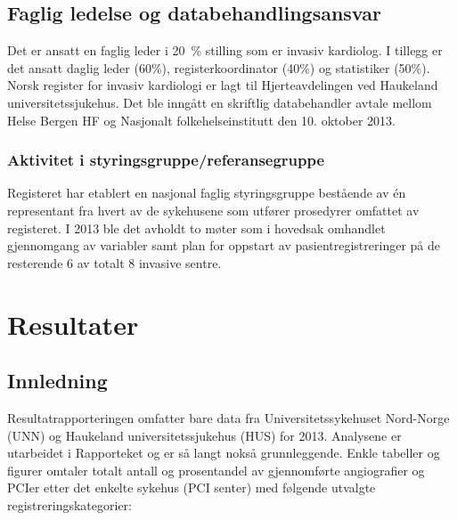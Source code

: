 \documentclass[norsk, a4paper]{report}
\begin{document}
\section{Faglig ledelse og databehandlingsansvar}\label{cha:led}
Det er ansatt en faglig leder i 20 \% stilling som er invasiv kardiolog. I tillegg er det ansatt daglig leder (60\%), registerkoordinator (40\%) og statistiker (50\%). Norsk register for invasiv kardiologi er lagt til Hjerteavdelingen ved Haukeland universitetssjukehus. Det ble inngått en skriftlig databehandler avtale mellom Helse Bergen HF og Nasjonalt folkehelseinstitutt den 10. oktober 2013.

\subsection{Aktivitet i styringsgruppe/referansegruppe}
Registeret har etablert en nasjonal faglig styringsgruppe bestående av én representant fra hvert av de sykehusene som utfører prosedyrer omfattet av registeret. I 2013 ble det avholdt to møter som i hovedsak omhandlet gjennomgang av variabler samt plan for oppstart av pasientregistreringer på de resterende 6 av totalt 8 invasive sentre.  






\chapter{Resultater}\label{cha:res}


\section{Innledning}

Resultatrapporteringen omfatter bare data fra Universitetssykehuset Nord-Norge (UNN) og Haukeland universitetssjukehus (HUS) for 2013. Analysene er utarbeidet i Rapporteket og er så langt nokså grunnleggende. 
Enkle tabeller og figurer omtaler totalt antall og prosentandel av gjennomførte angiografier og PCIer etter det enkelte sykehus (PCI senter) med følgende utvalgte registreringskategorier:
\end{document}

